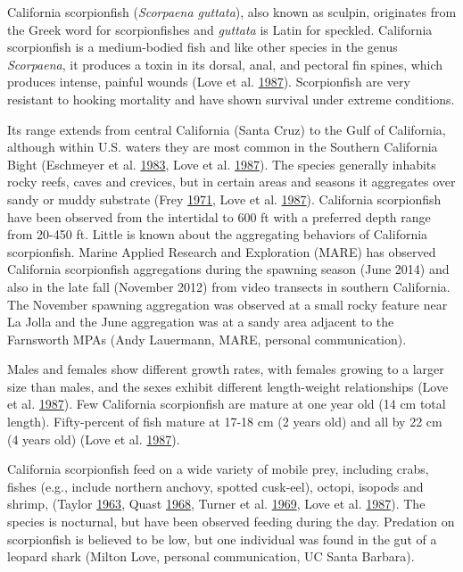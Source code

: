 \documentclass[12pt,]{article}
\begin{document}
California scorpionfish (\emph{Scorpaena guttata}), also known as
sculpin, originates from the Greek word for scorpionfishes and
\emph{guttata} is Latin for speckled. California scorpionfish is a
medium-bodied fish and like other species in the genus \emph{Scorpaena},
it produces a toxin in its dorsal, anal, and pectoral fin spines, which
produces intense, painful wounds (Love et al.
\protect\hyperlink{ref-Love1987}{1987}). Scorpionfish are very resistant
to hooking mortality and have shown survival under extreme conditions.

Its range extends from central California (Santa Cruz) to the Gulf of
California, although within U.S. waters they are most common in the
Southern California Bight (Eschmeyer et al.
\protect\hyperlink{ref-Eschmeyer1983}{1983}, Love et al.
\protect\hyperlink{ref-Love1987}{1987}). The species generally inhabits
rocky reefs, caves and crevices, but in certain areas and seasons it
aggregates over sandy or muddy substrate (Frey
\protect\hyperlink{ref-Frey1971}{1971}, Love et al.
\protect\hyperlink{ref-Love1987}{1987}). California scorpionfish have
been observed from the intertidal to 600 ft with a preferred depth range
from 20-450 ft. Little is known about the aggregating behaviors of
California scorpionfish. Marine Applied Research and Exploration (MARE)
has observed California scorpionfish aggregations during the spawning
season (June 2014) and also in the late fall (November 2012) from video
transects in southern California. The November spawning aggregation was
observed at a small rocky feature near La Jolla and the June aggregation
was at a sandy area adjacent to the Farnsworth MPAs (Andy Lauermann,
MARE, personal communication).

Males and females show different growth rates, with females growing to a
larger size than males, and the sexes exhibit different length-weight
relationships (Love et al. \protect\hyperlink{ref-Love1987}{1987}). Few
California scorpionfish are mature at one year old (14 cm total length).
Fifty-percent of fish mature at 17-18 cm (2 years old) and all by 22 cm
(4 years old) (Love et al. \protect\hyperlink{ref-Love1987}{1987}).

California scorpionfish feed on a wide variety of mobile prey, including
crabs, fishes (e.g., include northern anchovy, spotted cusk-eel),
octopi, isopods and shrimp, (Taylor
\protect\hyperlink{ref-Taylor1963}{1963}, Quast
\protect\hyperlink{ref-Quast1968}{1968}, Turner et al.
\protect\hyperlink{ref-Turner1969}{1969}, Love et al.
\protect\hyperlink{ref-Love1987}{1987}). The species is nocturnal, but
have been observed feeding during the day. Predation on scorpionfish is
believed to be low, but one individual was found in the gut of a leopard
shark (Milton Love, personal communication, UC Santa Barbara).
\end{document}
